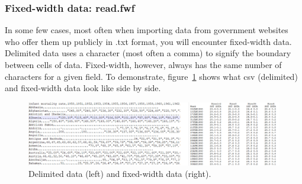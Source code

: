 \documentclass{report}
\newcommand{\code}[1]{\textsf{\ttfamily #1}}
\begin{document}
		\subsubsection{Fixed-width data: \code{read.fwf}}
		In some few cases, most often when importing data from government websites who offer them up publicly in .txt format, you will encounter fixed-width data. Delimited data uses a character (most often a comma) to signify the boundary between cells of data. Fixed-width, however, always has the same number of characters for a given field. To demonstrate, figure~\ref{fig:data} shows what csv (delimited) and fixed-width data look like side by side.
		\begin{figure}[h]
			\centering
			\includegraphics[width=1.0\textwidth]{data.png}
			\caption{Delimited data (left) and fixed-width data (right).}
			\label{fig:data}
		\end{figure}
		
\end{document}
